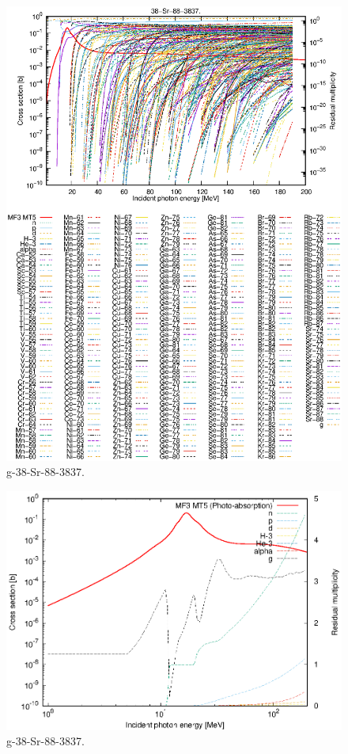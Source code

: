 \begin{figure}
 \includegraphics[width=\linewidth]{eps/g_38-Sr-88_3837.eps}
  \caption{g-38-Sr-88-3837.}
\end{figure}
\newpage \clearpage

\begin{figure}
 \includegraphics[width=\linewidth]{eps-log/g_38-Sr-88_3837.eps}
 \caption{g-38-Sr-88-3837.}
\end{figure}
\newpage \clearpage


